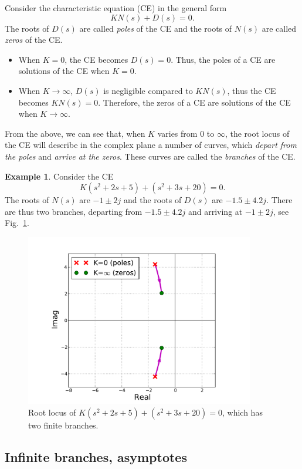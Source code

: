\documentclass[a4paper,11pt]{report}
\theoremstyle{definition}
\newtheorem{mdexample}{Example}
\newenvironment{example}%
  {\vspace{0.1cm}\begin{mdframed}[backgroundcolor=lightgray]\begin{mdexample}}%
  {\end{mdexample}\end{mdframed}\vspace{0.1cm}}
\begin{document}
Consider the characteristic equation (CE) in the general form
\[
KN(s) + D(s) = 0.
\]
The roots of $D(s)$ are called \emph{poles} of the CE and the roots
of $N(s)$ are called \emph{zeros} of the CE.

\begin{itemize}
\item When $K=0$, the CE becomes $D(s)=0$. Thus, the poles of a CE are solutions of
the CE when $K=0$. 
\item When $K\to\infty$, $D(s)$ is negligible compared to $KN(s)$,
  thus the CE becomes $KN(s)=0$. Therefore, the zeros of a CE are
  solutions of the CE when $K\to\infty$.
\end{itemize}

From the above, we can see that, when $K$ varies from 0 to $\infty$,
the root locus of the CE will describe in the complex plane a number
of curves, which \emph{depart from the poles} and \emph{arrive at the
  zeros}. These curves are called the \emph{branches} of the CE.

\begin{example}
  Consider the CE
  \[
  K(s^2+2s+5) + (s^2+3s+20) = 0.
  \]
  The roots of $N(s)$ are $-1\pm 2j$ and the roots of $D(s)$ are
  $-1.5\pm 4.2j$. There are thus two branches, departing from $-1.5\pm
  4.2j$ and arriving at $-1\pm 2j$, see Fig.~\ref{fig:rlocusda}.
  \begin{figure}[H]
    \centering
    \includegraphics[width=10cm]{fig/rlocusda.pdf}
    \caption{Root locus of $K(s^2+2s+5) + (s^2+3s+20) = 0$, which has
      two finite branches.}
    \label{fig:rlocusda}
  \end{figure}
\end{example}

\subsection{Infinite branches, asymptotes}
\end{document}

